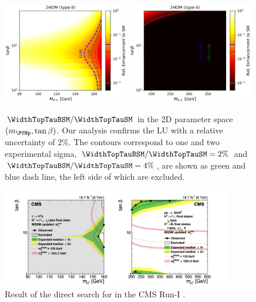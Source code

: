 \begin{figure}[ht]
    \centering
    \includegraphics[width=0.49\textwidth]{chapters/Physics/sectionBSM/figures/RelEnhance2.png}
    \includegraphics[width=0.49\textwidth]{chapters/Physics/sectionBSM/figures/RelEnhance2_heavy.png}
    \caption{$\WidthTopTauBSM/\WidthTopTauSM$  in the 2D parameter space $(m_{\PSHp}, \tan\beta)$. Our analysis confirms the LU with a relative uncertainty of $2\%$. The contours correspond to one and two experimental sigma, $\WidthTopTauBSM/\WidthTopTauSM = 2\%$ and $\WidthTopTauBSM/\WidthTopTauSM = 4\%$, are shown as green and blue dash line, the left side of which are excluded.  }
    \label{fig:physics:bsm:chargedHiggs:relEnahnce2d}
\end{figure}

\begin{figure}[ht]
    \centering
    \includegraphics[width=0.9\textwidth]{chapters/Physics/sectionBSM/figures/2HDM_search.png}
    \caption{Result of the direct search for \PSHp in the CMS Run-I \cite{Khachatryan:2015qxa}. }
    \label{fig:physics:bsm:chargedHiggs:directsearch}
\end{figure}


